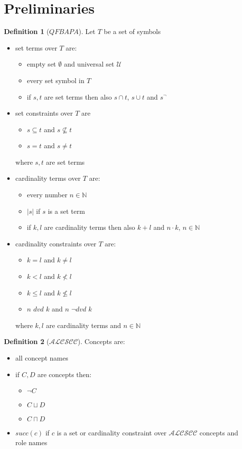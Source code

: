 \documentclass[a4paper,11pt]{scrartcl}
\theoremstyle{definition}
\newtheorem{mydef}{Definition}
\begin{document}
\section{Preliminaries}
\begin{mydef}[$QFBAPA$]
Let $T$ be a set of symbols
\begin{itemize}
\item set terms over $T$ are:
\begin{itemize}
\item empty set $\emptyset$ and universal set $
\mathcal{U}$
\item every set symbol in $T$
\item if $s,t$ are set terms then also $s\cap t$, $s\cup t$ and $s^{\neg}$
\end{itemize}
\item set constraints over $T$ are
\begin{itemize}
\item $s\subseteq t$ and $s\not\subseteq t$
\item $s=t$ and $s\neq t$
\end{itemize}
where $s,t$ are set terms
\item cardinality terms over $T$ are:
\begin{itemize}
\item every number $n\in \mathbb{N}$
\item $|s|$ if $s$ is a set term
\item if $k,l$ are cardinality terms then also $k+l$ and $n\cdot k$, $n\in \mathbb{N}$
\end{itemize}
\item cardinality constraints over $T$ are:
\begin{itemize}
\item $k=l$ and $k\neq l$
\item $k<l$ and $k\nless l$
\item $k\leq l$ and $k\not\leq l$
\item $n$ $dvd$ $k$ and $n$ $\neg dvd$ $k$
\end{itemize}
where $k,l$ are cardinality terms and $n\in\mathbb{N}$
\end{itemize}
\end{mydef}
\begin{mydef}[$\mathcal{ALCSCC}$]
Concepts are:
\begin{itemize}
\item all concept names
\item if $C,D$ are concepts then:
\begin{itemize}
\item $\neg C$
\item $C\sqcup D$
\item $C\sqcap D$
\end{itemize}
\item $succ(c)$ if $c$ is a set or cardinality constraint over $\mathcal{ALCSCC}$ concepts and role names
\end{itemize}
\end{mydef}
\end{document}
